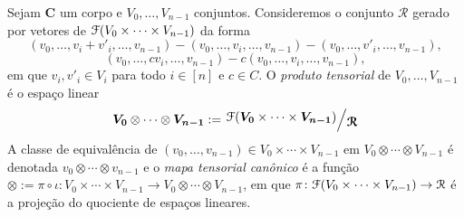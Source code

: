 \begin{definition}
Sejam $\bm C$ um corpo e $V_0,\ldots,V_{n-1}$ conjuntos. Consideremos o conjunto $\mathcal R$ gerado por vetores de $\mathcal{F}(V_0 \times \cdots \times V_{n-1})$ da forma
	\begin{equation*}
	(v_0,\ldots,v_i+v'_i,\ldots,v_{n-1}) - (v_0,\ldots,v_i,\ldots,v_{n-1}) - (v_0,\ldots,v'_i,\ldots,v_{n-1}),
	\end{equation*}
	\begin{equation*}
	(v_0,\ldots,cv_i,\ldots,v_{n-1}) - c(v_0,\ldots,v_i,\ldots,v_{n-1}),
	\end{equation*}
em que $v_i,v'_i \in V_i$ para todo $i \in [n]$ e $c \in C$. O \emph{produto tensorial} de $V_0,\ldots,V_{n-1}$ é o espaço linear
	\begin{equation*}
	\bm{V_0} \otimes \cdots \otimes \bm{V_{n-1}} := \quo{\liv(\bm{V_0} \times \cdots \times \bm{V_{n-1}})}{\bm{\mathcal R}}
	\end{equation*}
A classe de equivalência de $(v_0,\ldots,v_{n-1}) \in V_0 \times \cdots \times V_{n-1}$ em $V_0 \otimes \cdots \otimes V_{n-1}$ é denotada $v_0 \otimes \cdots \otimes v_{n-1}$ e o \emph{mapa tensorial canônico} é a função $\otimes := \pi \circ \iota\colon V_0 \times \cdots \times V_{n-1} \to  V_0 \otimes \cdots \otimes V_{n-1}$, em que $\pi\colon \mathcal{F}(V_0 \times \cdots \times V_{n-1}) \to \mathcal R$ é a projeção do quociente de espaços lineares.
\end{definition}




